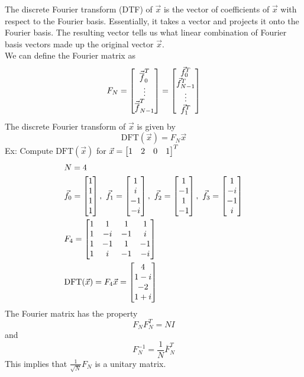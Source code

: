 \documentclass[11pt, fleqn]{article}
\begin{document}
The discrete Fourier transform (DTF) of $\vec{x}$ is the vector of coefficients of $\vec{x}$ with respect to the Fourier basis. Essentially, it takes a vector and projects it onto the Fourier basis. The resulting vector tells us what linear combination of Fourier basis vectors made up the original vector $\vec{x}$.\\
We can define the Fourier matrix as
$$F_N=\matrixx{\vec{\overline{f}}_0^T\\ \vdots\\ \vec{\overline{f}}_{N-1}^T}=\matrixx{\vec{f}_0^T\\ \vec{f}_{N-1}^T\\ \vdots\\ \vec{f}_1^T}$$
The discrete Fourier transform of $\vec{x}$ is given by
$$\mathrm{DFT}(\vec{x})=F_N\vec{x}$$
Ex: Compute $\mathrm{DFT}(\vec{x})$ for $\vec{x}=\matrixx{1 & 2 & 0 & 1}^T$
\begin{align*}
    &N=4\\
    &\vec{f}_0=\matrixx{1\\1\\1\\1},\ \vec{f}_1=\matrixx{1\\ i\\-1\\ -i},\ \vec{f}_2=\matrixx{1\\-1\\1\\-1},\ \vec{f}_3=\matrixx{1\\-i\\-1\\ i}\\
    &F_4=\matrixx{1 & 1 & 1 & 1\\ 1 & -i & -1 & i\\ 1 & -1 & 1 & -1\\ 1 & i & -1 & -i}\\
    &\mathrm{DFT}(\vec{x})=F_4\vec{x}=\matrixx{4\\ 1-i\\ -2\\ 1+i}
\end{align*}
The Fourier matrix has the property
$$F_NF_N^T=NI$$
and
$$F_N^{-1}=\frac{1}{N}\overline{F}_N^T$$
This implies that $\frac{1}{\sqrt{N}}F_N$ is a unitary matrix.\\
\end{document}
